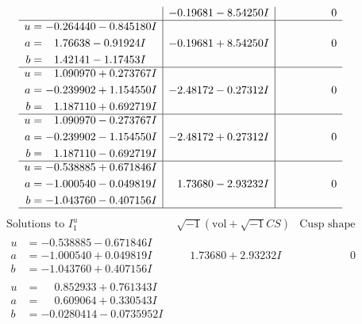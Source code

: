 \documentclass[1p]{elsarticle_modified}
\theoremstyle{definition}
\newcommand{\I}{\sqrt{-1}}
\begin{document}
$$\begin{array}{c|c|c}
 & -0.19681 - 8.54250 I & \phantom{-0.000000 } 0 \\ \hline\begin{aligned}
u &= -0.264440 - 0.845180 I \\
a &= \phantom{-}1.76638 - 0.91924 I \\
b &= \phantom{-}1.42141 - 1.17453 I\end{aligned}
 & -0.19681 + 8.54250 I & \phantom{-0.000000 } 0 \\ \hline\begin{aligned}
u &= \phantom{-}1.090970 + 0.273767 I \\
a &= -0.239902 + 1.154550 I \\
b &= \phantom{-}1.187110 + 0.692719 I\end{aligned}
 & -2.48172 - 0.27312 I & \phantom{-0.000000 } 0 \\ \hline\begin{aligned}
u &= \phantom{-}1.090970 - 0.273767 I \\
a &= -0.239902 - 1.154550 I \\
b &= \phantom{-}1.187110 - 0.692719 I\end{aligned}
 & -2.48172 + 0.27312 I & \phantom{-0.000000 } 0 \\ \hline\begin{aligned}
u &= -0.538885 + 0.671846 I \\
a &= -1.000540 - 0.049819 I \\
b &= -1.043760 - 0.407156 I\end{aligned}
 & \phantom{-}1.73680 - 2.93232 I & \phantom{-0.000000 } 0\\
 \hline 
 \end{array}$$\newpage$$\begin{array}{c|c|c}  
\text{Solutions to }I^u_{1}& \I (\text{vol} + \sqrt{-1}CS) & \text{Cusp shape}\\
 \hline 
\begin{aligned}
u &= -0.538885 - 0.671846 I \\
a &= -1.000540 + 0.049819 I \\
b &= -1.043760 + 0.407156 I\end{aligned}
 & \phantom{-}1.73680 + 2.93232 I & \phantom{-0.000000 } 0 \\ \hline\begin{aligned}
u &= \phantom{-}0.852933 + 0.761343 I \\
a &= \phantom{-}0.609064 + 0.330543 I \\
b &= -0.0280414 - 0.0735952 I\end{aligned}

\end{array}$$
\end{document}
